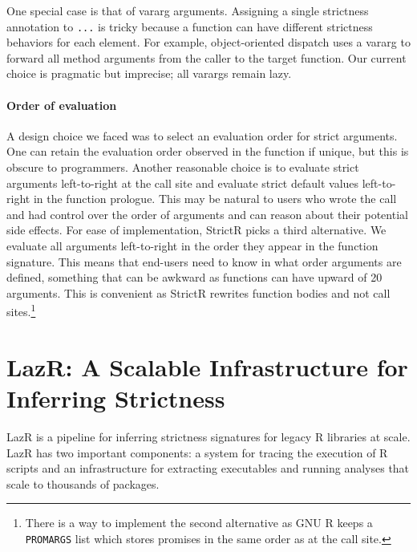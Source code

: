 \documentclass[review,screen,acmsmall]{acmart}
\renewcommand{\c}[1]{\lstinline |#1|\xspace}
\newcommand{\strictr}{{\sf StrictR}\xspace}
\newcommand{\lazr}{{\sf LazR}\xspace}
\begin{document}
One special case is that of vararg arguments. Assigning a single strictness
annotation to \c{...} is tricky because a function can have different strictness
behaviors for each element. For example, object-oriented dispatch uses a vararg
to forward all method arguments from the caller to the target function. Our
current choice is pragmatic but imprecise; all varargs remain lazy.

\paragraph{Order of evaluation} A design choice we faced was to select an
evaluation order for strict arguments. One can retain the evaluation order
observed in the function if unique, but this is obscure to programmers. Another
reasonable choice is to evaluate strict arguments left-to-right at the call site
and evaluate strict default values left-to-right in the function prologue. This
may be natural to users who wrote the call and had control over the order of
arguments and can reason about their potential side effects. For ease of
implementation, \strictr picks a third alternative. We evaluate all arguments
left-to-right in the order they appear in the function signature. This means
that end-users need to know in what order arguments are defined, something that
can be awkward as functions can have upward of 20 arguments. This is convenient
as \strictr rewrites function bodies and not call sites.\footnote{There is a way
  to implement the second alternative as GNU R keeps a \c{PROMARGS} list which
  stores promises in the same order as at the call site.}



\section{LazR: A Scalable Infrastructure for Inferring Strictness}\label{sec:lazr}

\lazr is a pipeline for inferring strictness signatures for legacy R libraries
at scale. \lazr has two important components: a system for tracing the execution
of R scripts and an infrastructure for extracting executables and running
analyses that scale to thousands of packages.
\end{document}
